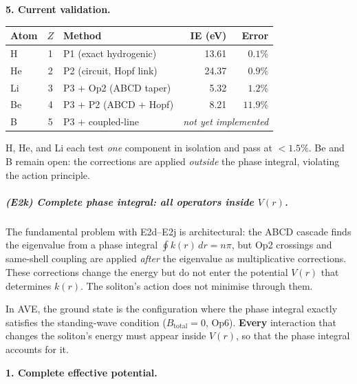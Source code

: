 \noindent\textbf{5. Current validation.}
\begin{center}
\small
\renewcommand{\arraystretch}{1.2}
\begin{tabular}{l c l r r}
\toprule
\textbf{Atom} & $Z$ &
\textbf{Method} &
\textbf{IE (eV)} &
\textbf{Error} \\
\midrule
H & 1 & P1 (exact hydrogenic) &
    13.61 & $0.1\%$ \\
He & 2 & P2 (circuit, Hopf link) &
    24.37 & $0.9\%$ \\
Li & 3 & P3 + Op2 (ABCD taper) &
    5.32 & $1.2\%$ \\
Be & 4 & P3 + P2 (ABCD + Hopf) &
    8.21 & $11.9\%$ \\
\midrule
B & 5 & P3 + coupled-line &
    \multicolumn{2}{c}{\emph{not yet implemented}} \\
\bottomrule
\end{tabular}
\end{center}
\noindent H, He, and Li each test \emph{one}
component in isolation and pass at $< 1.5\%$.
Be and B remain open: the corrections are
applied \emph{outside} the phase integral,
violating the action principle.

\subparagraph{(E2k) Complete phase integral:
all operators inside $V(r)$.}

The fundamental problem with E2d--E2j is
architectural: the ABCD cascade finds the
eigenvalue from a phase integral
$\oint k(r)\,dr = n\pi$, but Op2 crossings
and same-shell coupling are applied
\emph{after} the eigenvalue as multiplicative
corrections.  These corrections change the
energy but do not enter the potential $V(r)$
that determines $k(r)$.  The soliton's action
does not minimise through them.

In AVE, the ground state is the configuration
where the phase integral exactly satisfies
the standing-wave condition ($B_{\text{total}}
= 0$, Op6).  \textbf{Every} interaction that
changes the soliton's energy must appear inside
$V(r)$, so that the phase integral accounts
for it.

\noindent\textbf{1. Complete effective potential.}


